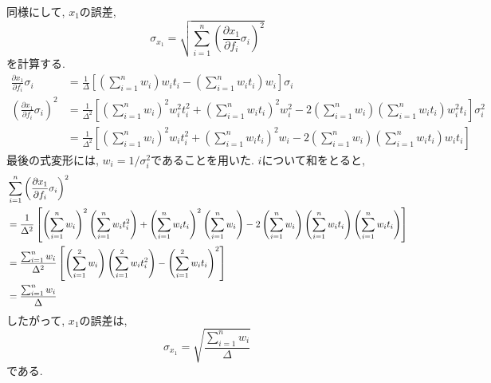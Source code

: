 同様にして, $x_{1}$の誤差, 
\begin{equation}
    \sigma_{x_{1}}
    =
    \sqrt
    {
        \sum_{i=1}^{n}
        \left(\frac{\partial x_{1}}{\partial f_{i}} \sigma_{i}\right)^{2}
    }
\end{equation}
を計算する. 
\begin{align}
    \frac{\partial x_{1}}{\partial f_{i}} \sigma_{i}
    &=
    \frac{1}{\Delta}
    \left[
        \left(\sum_{i=1}^{n} w_{i}\right) w_{i} t_{i}
        -
        \left(\sum_{i=1}^{n} w_{i} t_{i}\right)w_{i}
    \right] \sigma_{i}
    \\
    \left(\frac{\partial x_{1}}{\partial f_{i}} \sigma_{i}\right)^{2}
    &=
    \frac{1}{\Delta^{2}}
    \left[
        \left(\sum_{i=1}^{n} w_{i}\right)^{2} w_{i}^{2} t_{i}^{2}
        +
        \left(\sum_{i=1}^{n} w_{i} t_{i}\right)^{2} w_{i}^{2}
        -
        2
        \left(\sum_{i=1}^{n} w_{i}\right)
        \left(\sum_{i=1}^{n} w_{i} t_{i}\right) w_{i}^{2} t_{i}
    \right] \sigma_{i}^{2}
    \\ &=
    \frac{1}{\Delta^{2}}
    \left[
        \left(\sum_{i=1}^{n} w_{i}\right)^{2} w_{i} t_{i}^{2}
        +
        \left(\sum_{i=1}^{n} w_{i} t_{i}\right)^{2} w_{i}
        -
        2
        \left(\sum_{i=1}^{n} w_{i}\right)
        \left(\sum_{i=1}^{n} w_{i} t_{i}\right) w_{i} t_{i}
    \right]
\end{align}
最後の式変形には, $w_{i} = 1/\sigma_{i}^{2}$であることを用いた. 
$i$について和をとると, 
\begin{align}
    &
    \sum_{i=1}^{n}
    \left(\frac{\partial x_{1}}{\partial f_{i}} \sigma_{i}\right)^{2}
    \notag \\
    &=
    \frac{1}{\Delta^{2}}
    \left[
        \left(\sum_{i=1}^{n} w_{i}\right)^{2}
        \left(\sum_{i=1}^{n} w_{i} t_{i}^{2}\right)
        +
        \left(\sum_{i=1}^{n} w_{i} t_{i}\right)^{2}
        \left(\sum_{i=1}^{n} w_{i}\right)
        -
        2
        \left(\sum_{i=1}^{n} w_{i}\right)
        \left(\sum_{i=1}^{n} w_{i} t_{i}\right)
        \left(\sum_{i=1}^{n} w_{i} t_{i}\right)
    \right]
    \notag
    \\ &=
    \frac{\sum_{i=1}^{n} w_{i}}{\Delta^{2}}
    \left[
        \left(\sum_{i=1}^{2} w_{i}\right)
        \left(\sum_{i=1}^{2} w_{i} t_{i}^{2}\right)
        -
        \left(\sum_{i=1}^{2} w_{i} t_{i}\right)^{2}
    \right]
    \notag
    \\ &=
    \frac{\sum_{i=1}^{n} w_{i}}{\Delta}
\end{align}
したがって, $x_{1}$の誤差は, 
\begin{equation}
    \sigma_{x_{1}}
    =
    \sqrt{\frac{\sum_{i=1}^{n} w_{i}}{\Delta}}
\end{equation}
である. 

